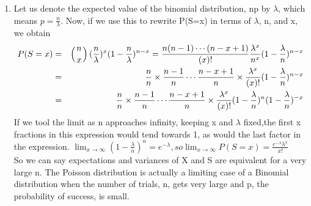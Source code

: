 \documentclass[12pt,thmsa]{article}\usepackage[]{graphicx}\usepackage[]{color}
\begin{document}
\begin{enumerate}
\item Let us denote the expected value of the binomial distribution, np by $ \lambda $, which means $ p=\frac{n}{\lambda} $.  Now, if we use this to rewrite P(S=x) in terms of $\lambda$, n, and x, we obtain \\
\begin{eqnarray*}
P(S = x) &= & \left( { n \atop x } \right)(\frac{n}{\lambda})^x(1-{\frac{n}{\lambda}})^{n-x}  = \frac{n(n-1) \cdots (n-x+1)}{(x)!}\frac{\lambda^x}{n^x}(1-\frac{\lambda}{n})^{n-x}\\
& = & \frac{n}{n}\times \frac{n-1}{n} \cdots \frac{n-x+1}{n} \times \frac{\lambda^x}{(x)!}(1-\frac{\lambda}{n})^{n-x}\\
&=& \frac{n}{n}\times \frac{n-1}{n} \cdots \frac{n-x+1}{n} \times \frac{\lambda^x}{(x)!}(1-\frac{\lambda}{n})^{n}(1-\frac{\lambda}{n})^{-x}\\
\end{eqnarray*}
If we tool the limit as n approaches infinity, keeping x and $\lambda$ fixed,the first x fractions in this expression would tend towards 1, as would the last factor in the expression. $ \lim_{x\to\infty} (1-\frac{\lambda}{n})^{n} =  e^{-\lambda}, so \lim_{x\to\infty}P(S=x)= \frac{e^{-\lambda}{\lambda}^x}{x!} $\\
So we can say expectations and variances of X and S are equivalent for a very large n. The Poisson distribution is actually a limiting case of a Binomial distribution when the number of trials, n, gets very large and p, the probability of success, is small.


\end{enumerate}
\end{document}
